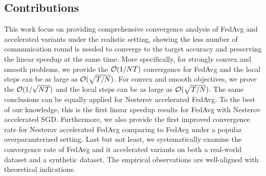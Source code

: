 \subsection{Contributions}
This work focus on providing comprehensive convergence analysis
of FedAvg and accelerated variants under the realistic setting, showing
the less number of communication round is needed to converge to the
target accuracy and preserving the linear speedup at the same time.
More specifically, for strongly convex and smooth problems, we provide the {\small{${\mathcal{O}}(1/NT)$}} convergence  for FedAvg and the local steps can be as large as {\small{${\mathcal{O}}(\sqrt{T/N})$}}. For convex and smooth objectives, we prove the {\small{${\mathcal{O}}(1/\sqrt{NT})$}} and the local steps can be as large as {\small{${\mathcal{O}}(\sqrt{T/N})$}}. The same conclusions can be equally applied for Nesterov accelerated FedAvg. To the best of our knowledge, this is the first linear speedup results for FedAvg with Nesterov accelerated SGD. Furthermore, 
we also provide the first improved convergence rate for Nesterov accelerated FedAvg comparing to FedAvg under a popular overparamterized setting. 
Last but not least, we systematically examine the convergence rate of
FedAvg and it accelerated variants on both a real-world dataset and a synthetic dataset. The empirical observations are well-aligned with theoretical indications.








